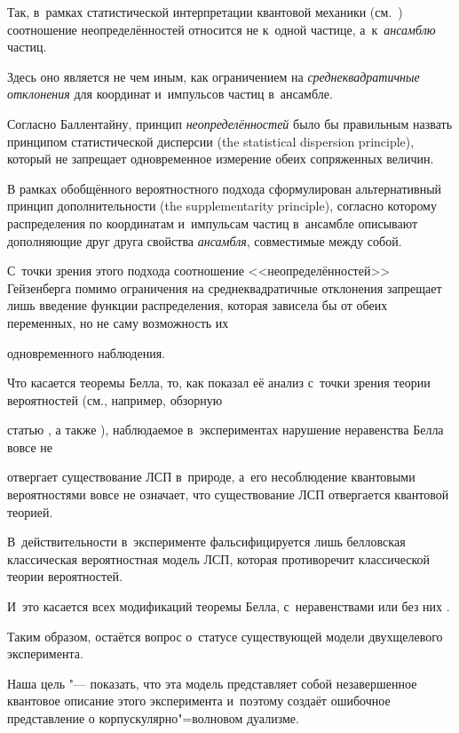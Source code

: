 Так, в~рамках статистической интерпретации квантовой механики (см.~\cite{chup:Bal}) соотношение неопределённостей относится не к~одной частице, а~к~{\it ансамблю} частиц. 

Здесь оно является не чем иным, как ограничением на {\it среднеквадратичные отклонения} для координат и~импульсов частиц в~ансамбле. 

Согласно Баллентайну, принцип {\it неопределённостей} было бы правильным назвать принципом статистической дисперсии (the statistical dispersion principle), который не запрещает одновременное измерение обеих сопряженных величин.



В рамках обобщённого вероятностного подхода \cite{chup:Hr1} сформулирован альтернативный принцип дополнительности (the supplementarity principle), согласно которому распределения по координатам и~импульсам частиц в~ансамбле описывают дополняющие друг друга свойства {\it ансамбля}, совместимые между собой. 

С~точки зрения этого подхода соотношение <<неопределённостей>> Гейзенберга помимо ограничения на среднеквадратичные отклонения  запрещает лишь введение функции распределения, которая зависела бы от обеих переменных, но не саму возможность их

одновременного наблюдения.



Что касается теоремы Белла, то, как показал её анализ с~точки зрения теории вероятностей (см., например, обзорную

статью \cite{chup:Hre}, а также \cite{chup:Ac5, chup:Hr5}), наблюдаемое в~экспериментах нарушение неравенства Белла вовсе не

отвергает существование ЛСП в~природе, а~его несоблюдение квантовыми вероятностями вовсе не означает, что существование ЛСП отвергается квантовой теорией. 

В~действительности в~эксперименте фальсифицируется лишь белловская классическая вероятностная модель ЛСП, которая противоречит классической теории вероятностей. 

И~это касается всех модификаций теоремы Белла, с~неравенствами или без них \cite{chup:Ac1}.



Таким образом, остаётся вопрос о~статусе существующей модели двухщелевого эксперимента. 

Наша цель "--- показать, что эта модель представляет собой незавершенное квантовое описание этого эксперимента и~поэтому создаёт ошибочное  представление о корпускулярно"=волновом дуализме. 

